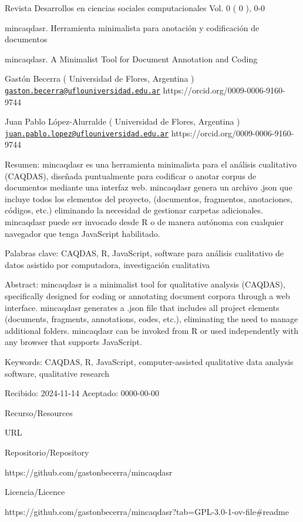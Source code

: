 \documentclass[
]{article}
\author{}
\date{\vspace{-2.5em}}
\begin{document}
Revista Desarrollos en ciencias sociales computacionales Vol. 0 ( 0 ),
0-0

mincaqdasr. Herramienta minimalista para anotación y codificación de
documentos

mincaqdasr. A Minimalist Tool for Document Annotation and Coding

Gastón Becerra ( Universidad de Flores, Argentina )
\href{mailto:gaston.becerra@uflouniversidad.edu.ar}{\nolinkurl{gaston.becerra@uflouniversidad.edu.ar}}
https://orcid.org/0009-0006-9160-9744

Juan Pablo López-Alurralde ( Universidad de Flores, Argentina )
\href{mailto:juan.pablo.lopez@uflouniversidad.edu.ar}{\nolinkurl{juan.pablo.lopez@uflouniversidad.edu.ar}}
https://orcid.org/0009-0006-9160-9744

Resumen: mincaqdasr es una herramienta minimalista para el análisis
cualitativo (CAQDAS), diseñada puntualmente para codificar o anotar
corpus de documentos mediante una interfaz web. mincaqdasr genera un
archivo .json que incluye todos los elementos del proyecto, (documentos,
fragmentos, anotaciones, códigos, etc.) eliminando la necesidad de
gestionar carpetas adicionales. mincaqdasr puede ser invocado desde R o
de manera autónoma con cualquier navegador que tenga JavaScript
habilitado.

Palabras clave: CAQDAS, R, JavaScript, software para análisis
cualitativo de datos asistido por computadora, investigación cualitativa

Abstract: mincaqdasr is a minimalist tool for qualitative analysis
(CAQDAS), specifically designed for coding or annotating document
corpora through a web interface. mincaqdasr generates a .json file that
includes all project elements (documents, fragments, annotations, codes,
etc.), eliminating the need to manage additional folders. mincaqdasr can
be invoked from R or used independently with any browser that supports
JavaScript.

Keywords: CAQDAS, R, JavaScript, computer-assisted qualitative data
analysis software, qualitative research

Recibido: 2024-11-14 \textbar{} Aceptado: 0000-00-00

Recurso/Resources

URL

Repositorio/Repository

https://github.com/gastonbecerra/mincaqdasr

Licencia/Licence

https://github.com/gastonbecerra/mincaqdasr?tab=GPL-3.0-1-ov-file\#readme
\end{document}
